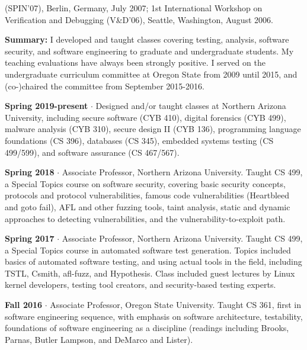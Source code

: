 \documentclass[ComputerScience]{vita}
\begin{document}
\begin{vita}
\begin{Panel and Committee Service}
(SPIN'07), Berlin, Germany, July 2007; 1st International Workshop on Verification and Debugging (V\&D'06), Seattle, Washington, August 2006.
\end{Panel and Committee Service}


\begin{Teaching}
\item {\bf Summary:} I developed and taught classes covering testing,
  analysis, software security, and software engineering to graduate
  and undergraduate students.  My teaching evaluations have always been strongly positive.  I served on the undergraduate curriculum committee at Oregon State from 2009 until 2015, and (co-)chaired the committee from September 2015-2016.

\item{\bf Spring 2019-present} $\cdot$ Designed and/or taught classes at
  Northern Arizona University, including secure software (CYB 410), digital forensics (CYB 499), malware
  analysis (CYB 310), secure design II (CYB 136),
  programming language foundations (CS 396), databases (CS 345),
  embedded systems testing (CS 499/599), and
  software assurance (CS 467/567).
  
\item{\bf Spring 2018} $\cdot$ Associate Professor, Northern Arizona
  University.  Taught CS 499, a Special Topics course on software
  security, covering basic security concepts, protocols and protocol
  vulnerabilities, famous code vulnerabilities (Heartbleed and goto fail), AFL and other
  fuzzing tools, taint analysis, static and dynamic approaches to
  detecting vulnerabilities, and the vulnerability-to-exploit path. 

\item{\bf Spring 2017} $\cdot$ Associate Professor, Northern Arizona University.  Taught CS 499, a Special Topics course in automated software test generation.  Topics included basics of automated software testing, and using actual tools in the field, including TSTL, Csmith, afl-fuzz, and Hypothesis.  Class included guest lectures by Linux kernel developers, testing tool creators, and security-based testing experts.

\item{\bf Fall 2016} $\cdot$ Associate Professor, Oregon State University.  Taught CS 361, first in software engineering sequence, with emphasis on software architecture, testability, foundations of software engineering as a discipline (readings including Brooks, Parnas, Butler Lampson, and DeMarco and Lister).


\end{Teaching}
\end{vita}
\end{document}
